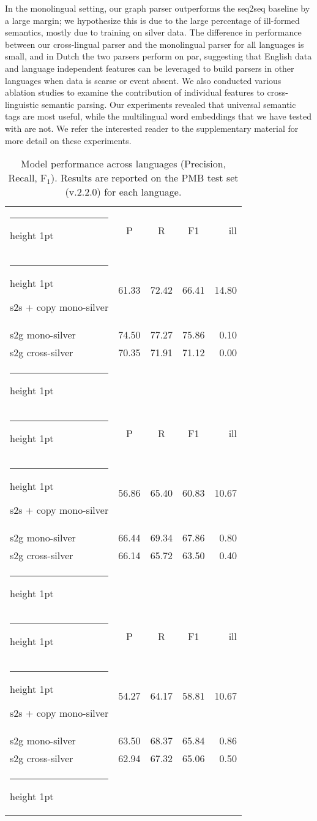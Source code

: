 \documentclass[11pt,a4paper]{article}
\makeatletter
\theoremstyle{plain}
\newcommand{\thickhline}{\noalign {\ifnum 0=`}\fi \hrule height 1pt
    \futurelet \reserved@a \@xhline
}
\makeatother
\begin{document}
In the monolingual setting, our graph parser outperforms the seq2seq
baseline by a large margin; we hypothesize this is due to the large
percentage of ill-formed semantics, mostly due to training on silver
data. The difference in performance between our cross-lingual parser and the
monolingual parser for all languages is small, and in Dutch the two parsers perform on par, suggesting that English data
and language independent features can be leveraged to build parsers in
other languages when data is scarse or event absent. We also conducted
various ablation studies to examine the contribution of individual
features to cross-linguistic semantic parsing. Our experiments
revealed that universal semantic tags are most useful, while
the multilingual word embeddings that we have tested with are not. We refer the interested reader to the supplementary material for more detail on these experiments.

\begin{table}[t]
\begin{center}
\begin{small}  

  \begin{tabular}{@{}lcccr@{}}         \thickhline
\multicolumn{1}{c}{\emph{Italian}}           & P & R & F1 & ill \\         \thickhline
s2s + copy mono-silver & 61.33 & 72.42 & 66.41 & 14.80 \\
s2g mono-silver & 74.50 & 77.27 & 75.86 & 0.10 \\
s2g cross-silver & 70.35 & 71.91 & 71.12 & 0.00 \\\thickhline
\multicolumn{4}{c}{} \\\thickhline
\multicolumn{1}{c}{\emph{German}}           & P & R & F1 & ill \\         \thickhline
s2s + copy mono-silver& 56.86 & 65.40 & 60.83 & 10.67 \\
s2g mono-silver& 66.44 & 69.34 & 67.86 & 0.80 \\
s2g cross-silver& 66.14 & 65.72 & 63.50 & 0.40 \\\thickhline
\multicolumn{4}{c}{} \\\thickhline
\multicolumn{1}{c}{\emph{Dutch}}           & P & R & F1 & ill \\         \thickhline
s2s + copy mono-silver& 54.27 & 64.17 & 58.81 & 10.67\\
s2g mono-silver& 63.50 & 68.37 & 65.84 & 0.86\\
s2g cross-silver& 62.94 & 67.32 & 65.06 & 0.50\\\thickhline
    \end{tabular}
\end{small}
\end{center}
\caption{Model performance across languages (Precision, Recall,
  F$_1$). Results are reported on the PMB test set (v.2.2.0) for each language.}
\label{monoother}
\end{table}
\end{document}
